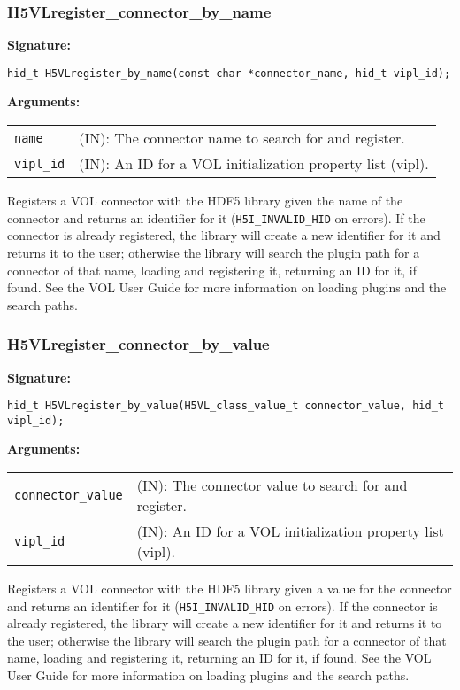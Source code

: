 \subsubsection{H5VLregister\_connector\_by\_name}
\begin{mdframed}[style=bgbox]
\textbf{Signature:}
\begin{lstlisting}
hid_t H5VLregister_by_name(const char *connector_name, hid_t vipl_id);
\end{lstlisting}
\textbf{Arguments:}\\
\begin{tabular}{l p{13.5cm}}
  {\tt name} & (IN): The connector name to search for and register.\\
  {\tt vipl\_id} & (IN): An ID for a VOL initialization property list (vipl).\\
\end{tabular}
\end{mdframed}
Registers a VOL connector with the HDF5 library given the name of the connector and returns an identifier for it (\texttt{H5I\_INVALID\_HID} on errors). If the connector is already registered, the library will create a new identifier for it and returns it to the user; otherwise the library will search the plugin path for a connector of that name, loading and registering it, returning an ID for it, if found. See the VOL User Guide for more information on loading plugins and the search paths.
\bigskip

\subsubsection{H5VLregister\_connector\_by\_value}
\begin{mdframed}[style=bgbox]
\textbf{Signature:}
\begin{lstlisting}
hid_t H5VLregister_by_value(H5VL_class_value_t connector_value, hid_t vipl_id);
\end{lstlisting}
\textbf{Arguments:}\\
\begin{tabular}{l p{13.5cm}}
  {\tt connector\_value} & (IN): The connector value to search for and register.\\
  {\tt vipl\_id} & (IN): An ID for a VOL initialization property list (vipl).\\
\end{tabular}
\end{mdframed}
Registers a VOL connector with the HDF5 library given a value for the connector and returns an identifier for it (\texttt{H5I\_INVALID\_HID} on errors). If the connector is already registered, the library will create a new identifier for it and returns it to the user; otherwise the library will search the plugin path for a connector of that name, loading and registering it, returning an ID for it, if found. See the VOL User Guide for more information on loading plugins and the search paths.
\bigskip


